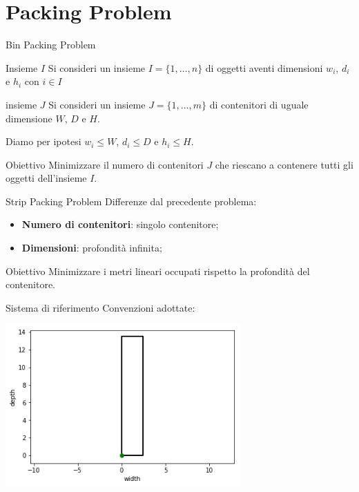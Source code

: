 \documentclass{beamer}
\begin{document}
\section{Packing Problem}
\begin{frame}{Bin Packing Problem}
	\begin{block}{Insieme $I$}
		Si consideri un insieme $I = \{1,\dots,n\}$ di oggetti aventi dimensioni $w_{i}$, $d_{i}$ e $h_{i}$ con $i \in I$	
	\end{block}
	\begin{block}{insieme $J$}
		Si consideri un insieme $J = \{1,\dots,m\}$ di contenitori di uguale dimensione $W$, $D$ e $H$.
	\end{block}
	Diamo per ipotesi $w_{i} \leq W$, $d_{i} \leq D$ e $h_{i} \leq H$.
	\begin{alertblock}{Obiettivo}
		Minimizzare il numero di contenitori $J$ che riescano a contenere tutti gli oggetti dell'insieme $I$.
	\end{alertblock}
\end{frame}

\begin{frame}{Strip Packing Problem}
	Differenze dal precedente problema:\vspace{.5em}
	\begin{itemize}
		\item \textbf{Numero di contenitori}: singolo contenitore;
		\item \textbf{Dimensioni}: profondit\`a infinita;
	\end{itemize}
	\begin{alertblock}{Obiettivo}
		Minimizzare i metri lineari occupati rispetto la profondit\`a del contenitore.
	\end{alertblock}
\end{frame}

\begin{frame}{Sistema di riferimento}
	Convenzioni adottate: \vspace{.5em}
	\begin{center}
		\includegraphics[width=9cm]{figures/cartesian_wd}
	\end{center}
\end{frame}
\end{document}
